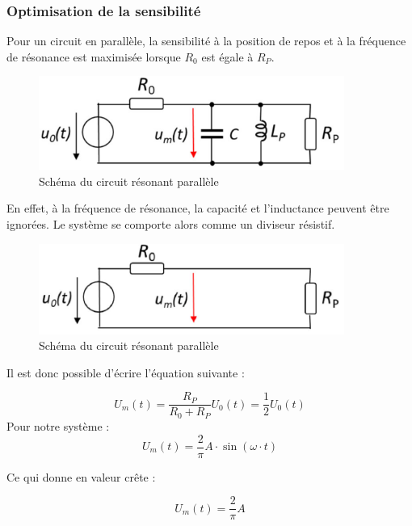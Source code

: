 \subsubsection{Optimisation de la sensibilité}

Pour un circuit en parallèle, la sensibilité à la position de repos et à la fréquence de résonance
est maximisée lorsque $R_0$ est égale à $R_P$.

\begin{figure}[H]
    \centering
    \includegraphics[width=10cm]{Images/Seance2/Circuit_para.png}
    \caption{Schéma du circuit résonant parallèle}
    \label{fig:circ_res_para}
\end{figure}

\vspace{0,2cm}

En effet, à la fréquence de résonance, la capacité et l'inductance peuvent être ignorées. Le système
se comporte alors comme un diviseur résistif.
\begin{figure}[H]
    \centering
    \includegraphics[width=10cm]{Images/Seance2/Circuit_ressss.png}
    \caption{Schéma du circuit résonant parallèle}
    \label{fig:circ_ressss}
\end{figure}

Il est donc possible d'écrire l'équation suivante :

\begin{equation*}
    U_m(t) = \frac{R_P}{R_0+R_P}U_0(t)= \frac{1}{2}U_0(t)
\end{equation*}
Pour notre système :
\begin{equation*}
    U_m(t) = \frac{2}{\pi} A \cdot \sin(\omega \cdot t) 
\end{equation*}

Ce qui donne en valeur crête :

\begin{equation*}
    U_m(t) = \frac{2}{\pi} A 
\end{equation*}

